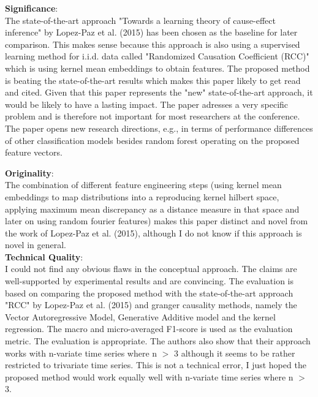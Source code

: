 \documentclass[a4paper]{article}
\begin{document}
{\noindent \textbf{Significance}:\\

The state-of-the-art approach "Towards a learning theory of cause-effect inference" by Lopez-Paz et al. (2015) has been chosen as the  baseline for later comparison. This makes sense because this approach is also using a supervised learning method for i.i.d. data called "Randomized Causation Coefficient (RCC)" which is using kernel mean embeddings to obtain features. The proposed method is beating the state-of-the-art results which makes this paper likely to get read and cited. Given that this paper represents the "new" state-of-the-art approach, it would be likely to have a lasting impact. The paper adresses a very specific problem and is therefore not important for most researchers at the conference. The paper opens new research directions, e.g., in terms of performance differences of other classification models besides random forest operating on the proposed feature vectors.\\

\newpage

\noindent \textbf{Originality}:\\

The combination of different feature engineering steps (using kernel mean embeddings to map distributions into a reproducing kernel hilbert space, applying maximum mean discrepancy as a distance measure in that space and later on using random fourier features) makes this paper distinct and novel from the work of Lopez-Paz et al. (2015), although I do not know if this approach is novel in general.\\

\noindent \textbf{Technical Quality}:\\

I could not find any obvious flaws in the conceptual approach. The claims are well-supported by experimental results and are convincing. The evaluation is based on comparing the proposed method with the state-of-the-art approach "RCC" by Lopez-Paz et al. (2015) and granger causality methods, namely the Vector Autoregressive Model, Generative Additive model and the kernel regression. The macro and micro-averaged F1-score is used as the evaluation metric. The evaluation is appropriate. The authors also show that their approach works with n-variate time series where n $>$ 3 although it seems to be rather restricted to trivariate time series. This is not a technical error, I just hoped the proposed method would work equally well with n-variate time series where n $>$ 3.\\


}
\end{document}
